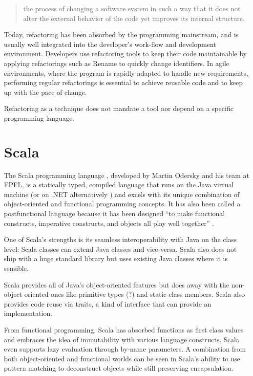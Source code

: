 \documentclass[10pt,a4paper,oneside]{scrreprt}
\begin{document}
\begin{quotation}
the process of changing a software system in such a way that it does not alter the external behavior of the code yet improves its internal structure.
\end{quotation} 

Today, refactoring has been absorbed by the programming mainstream, and is usually well integrated into the developer's work-flow and development environment. Developers use refactoring tools to keep their code maintainable by applying refactorings such as Rename to quickly change identifiers. In agile environments, where the program is rapidly adapted to handle new requirements, performing regular refactorings is essential to achieve reusable code and to keep up with the pace of change.

Refactoring as a technique does not mandate a tool nor depend on a specific programming language.

\section{Scala}

The Scala programming language \cite{ProgrammingScala}, developed by Martin Odersky and his team at EPFL, is a statically typed, compiled language that runs on the Java virtual machine (or on .NET alternatively \cite{ScalacNet}) and excels with its unique combination of object-oriented and functional programming concepts. It has also been called a postfunctional language because it has been designed ``to make functional constructs, imperative constructs, and objects all play well together'' \cite{ScalaPostFunctional}. 

One of Scala's strengths is its seamless interoperability with Java on the class level: Scala classes can extend Java classes and vice-versa. Scala also does not ship with a huge standard library but uses existing Java classes where it is sensible.

Scala provides all of Java's object-oriented features but does away with the non-object oriented ones like primitive types (?) and static class members. Scala also provides code reuse via traits, a kind of interface that can provide an implementation.

From functional programming, Scala has absorbed functions as first class values and embraces the idea of immutability with various language constructs. Scala even supports lazy evaluation through by-name parameters. A combination from both object-oriented and functional worlds can be seen in Scala's ability to use pattern matching to deconstruct objects while still preserving encapsulation.
\end{document}

